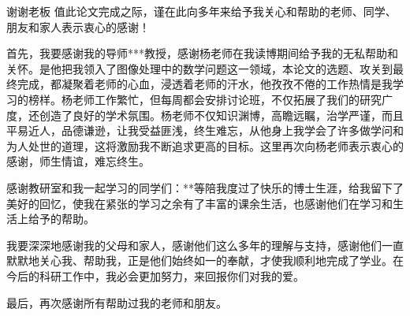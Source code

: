 \begin{thanks}
谢谢老板
值此论文完成之际，谨在此向多年来给予我关心和帮助的老师、同学、朋友和家人表示衷心的感谢！

首先，我要感谢我的导师***教授，感谢杨老师在我读博期间给予我的无私帮助和关怀。是他把我领入了图像处理中的数学问题这一领域，本论文的选题、攻关到最终完成，都凝聚着老师的心血，浸透着老师的汗水，他孜孜不倦的工作热情是我学习的榜样。杨老师工作繁忙，但每周都会安排讨论班，不仅拓展了我们的研究广度，还创造了良好的学术氛围。杨老师不仅知识渊博，高瞻远瞩，治学严谨，而且平易近人，品德谦逊，让我受益匪浅，终生难忘，从他身上我学会了许多做学问和为人处世的道理，这将激励我不断追求更高的目标。这里再次向杨老师表示衷心的感谢，师生情谊，难忘终生。

感谢教研室和我一起学习的同学们：**等陪我度过了快乐的博士生涯，给我留下了美好的回忆，使我在紧张的学习之余有了丰富的课余生活，也感谢他们在学习和生活上给予的帮助。

我要深深地感谢我的父母和家人，感谢他们这么多年的理解与支持，感谢他们一直默默地关心我、帮助我，正是他们始终如一的奉献，才使我顺利地完成了学业。在今后的科研工作中，我必会更加努力，来回报你们对我的爱。

最后，再次感谢所有帮助过我的老师和朋友。
\end{thanks}
